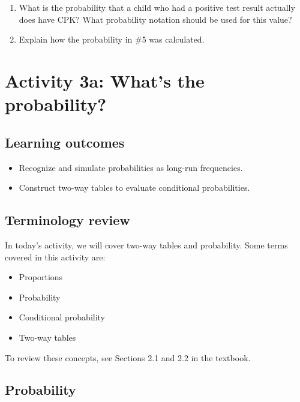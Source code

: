 \documentclass[
]{report}
\newcommand{\rgs}{\vspace{12pt}} %
\begin{document}
\begin{enumerate}
\def\labelenumi{\arabic{enumi}.}
\setcounter{enumi}{4}
\item
  What is the probability that a child who had a positive test result actually does have CPK? What probability notation should be used for this value?
  \rgs
\item
  Explain how the probability in \#5 was calculated.
\end{enumerate}

\newpage

\hypertarget{activity-3a-whats-the-probability}{%
\section{Activity 3a: What's the probability?}\label{activity-3a-whats-the-probability}}


\hypertarget{learning-outcomes-4}{%
\subsection{Learning outcomes}\label{learning-outcomes-4}}

\begin{itemize}
\item
  Recognize and simulate probabilities as long-run frequencies.
\item
  Construct two-way tables to evaluate conditional probabilities.
\end{itemize}

\hypertarget{terminology-review-4}{%
\subsection{Terminology review}\label{terminology-review-4}}

In today's activity, we will cover two-way tables and probability. Some terms covered in this activity are:

\begin{itemize}
\item
  Proportions
\item
  Probability
\item
  Conditional probability
\item
  Two-way tables
\end{itemize}

To review these concepts, see Sections 2.1 and 2.2 in the textbook.

\hypertarget{probability}{%
\subsection{Probability}\label{probability}}
\end{document}

